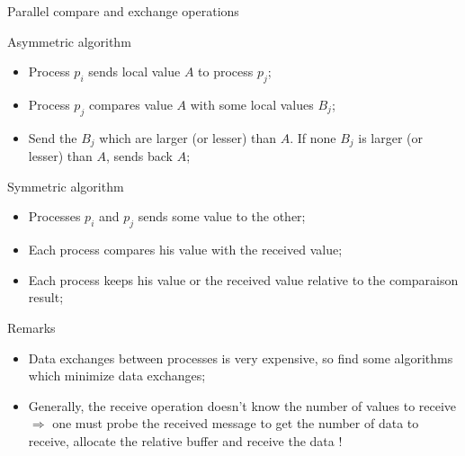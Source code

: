 \documentclass[compress,10pt,aspectratio=169]{beamer}
\begin{document}
\begin{frame}[fragile]{Parallel compare and exchange operations}
  \scriptsize
  \begin{block}{\small Asymmetric algorithm}
    \begin{itemize}
    \item Process $p_{i}$ sends local value $A$ to process $p_{j}$;
    \item Process $p_{j}$ compares value $A$ with some local values $B_{j}$;
    \item Send the $B_{j}$ which are larger (or lesser) than $A$. If none $B_{j}$ is larger (or lesser) than $A$, sends back $A$;
    \end{itemize}
  \end{block}

  \begin{block}{\small Symmetric algorithm}
    \begin{itemize}
    \item Processes $p_{i}$ and $p_{j}$ sends some value to the other;
    \item Each process compares his value with the received value;
    \item Each process keeps his value or the received value relative to the comparaison result;
    \end{itemize}
  \end{block}

  
  \begin{alertblock}{\small Remarks}
    \begin{itemize}
    \item Data exchanges between processes is very expensive, so find some algorithms which minimize data exchanges;
    \item Generally, the receive operation doesn't know the number of values to receive $\Rightarrow$ one must probe the
          received message to get the number of data to receive, allocate the relative buffer and receive the data !
    \end{itemize}
  \end{alertblock}
\end{frame}
\end{document}
